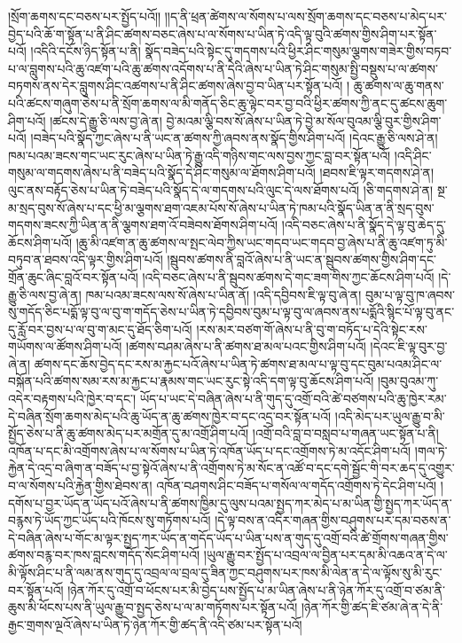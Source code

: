 །སྲོག་ཆགས་དང་བཅས་པར་སྤྱོད་པའོ།། །།ད་ནི་ཕྲན་ཚེགས་ལ་སོགས་པ་ལས་སྲོག་ཆགས་དང་བཅས་པ་མེད་པར་བྱེད་པའི་ཆོ་ག་སྟོན་པ་ནི་ཤིང་ཚགས་བཅང་ཞེས་པ་ལ་སོགས་པ་ཡིན་ཏེ་འདི་ལྟ་བུའི་ཚགས་གྱིས་ཤིག་པར་སྟོན་པའོ། །འདིའི་དངོས་ཉིད་སྟོན་པ་ནི། སྣོད་བཟེད་པའི་སྟེང་དུ་གདགས་པའི་ཕྱིར་ཤིང་གསུམ་ལྕགས་གཟེར་གྱིས་བཏབ་པ་ལ་བླུགས་པའི་ཆུ་འཛག་པའི་ཆུ་ཚགས་འདོགས་པ་ནི་དེའི་ཞེས་པ་ཡིན་ཏེ་ཤིང་གསུམ་སྤྱི་བསྡུས་པ་ལ་ཚགས་བཏགས་ནས་དེར་བླུགས་ཤིང་འཚགས་པ་ནི་ཤིང་ཚགས་ཞེས་བྱ་བ་ཡིན་པར་སྟོན་པའོ། །
ཆུ་ཚགས་ལ་ཆུ་གནས་པའི་ཚངས་གཞུག་ཅེས་པ་ནི་སྲོག་ཆགས་ལ་མི་གནོད་ཅིང་ཆུ་ལྟེང་བར་བྱ་བའི་ཕྱིར་ཚགས་ཀྱི་ནང་དུ་ཚངས་ཆུག་ཤིག་པའོ། །ཚངས་དེ་རྒྱུ་ཅི་ལས་བྱ་ཞེ་ན། བྱེ་མའམ་ལྕི་བས་སོ་ཞེས་པ་ཡིན་ཏེ་བྱེ་མ་སོལ་བུའམ་ལྕི་བུར་གྱིས་ཤིག་པའོ། །བཟེད་པའི་སྣོད་ཀྱང་ཞེས་པ་ནི་ཡང་ན་ཚགས་ཀྱི་ཞབས་ནས་སྣོད་གྱིས་ཤིག་པའོ། །དེའང་རྒྱུ་ཅི་ལས་ཤེ་ན། ཁམ་པའམ་ཟངས་གང་ཡང་རུང་ཞེས་པ་ཡིན་ཏེ་རྒྱུ་འདི་གཉིས་གང་ལས་བྱས་ཀྱང་བླ་བར་སྟོན་པའོ། །འདི་ཤིང་གསུམ་ལ་གདགས་ཞེས་པ་ནི་བཟེད་པའི་སྣོད་དེ་ཤིང་གསུམ་ལ་ཐོགས་ཤིག་པའོ། །ཐབས་ཇི་ལྟར་གདགས་ཤེ་ན། ལུང་ནས་བརྟོད་ཅེས་པ་ཡིན་ཏེ་བཟེད་པའི་སྣོད་དེ་ལ་གདགས་པའི་ལུང་དེ་ལས་ཐོགས་པའོ། །ཅི་གདགས་ཤེ་ན། སྔ་མ་སྲད་བུས་སོ་ཞེས་པ་དང་ཕྱི་མ་ལྕགས་ཐག་འཇམ་པོས་སོ་ཞེས་པ་ཡིན་ཏེ་ཁམ་པའི་སྣོད་ཡིན་ན་ནི་སྲད་བུས་གདགས་ཟངས་ཀྱི་ཡིན་ན་ནི་ལྕགས་ཐག་འོ་བཟེབས་ཐོགས་ཤིག་པའོ། །འདི་བཅང་ཞེས་པ་ནི་སྣོད་དེ་ལྟ་བུ་ཆེད་དུ་ཆོངས་ཤིག་པའོ། །ཆུ་མི་འཛག་ན་ཆུ་ཚགས་ལ་སྤང་ལེབ་ཀྱིས་ཡང་གདབ་ཡང་གདབ་བྱ་ཞེས་པ་ནི་ཆུ་འཛག་ཏུ་མི་བཏུབ་ན་ཐབས་འདི་ལྟར་གྱིས་ཤིག་པའོ། །སྦུབས་ཚགས་ནི་བླའོ་ཞེས་པ་ནི་ཡང་ན་སྦུབས་ཚགས་གྱིས་ཤིག་དང་གྲོན་ཆུང་ཞིང་བླའོ་བར་སྟོན་པའོ། །འདི་བཅང་ཞེས་པ་ནི་སྦུབས་ཚགས་དེ་གང་ཟག་གིས་ཀྱང་ཆོངས་ཤིག་པའོ། །དེ་རྒྱུ་ཅི་ལས་བྱ་ཞེ་ན། ཁམ་པའམ་ཟངས་ལས་སོ་ཞེས་པ་ཡིན་ནོ། །འདི་དབྱིབས་ཇི་ལྟ་བུ་ཞེ་ན། བུམ་པ་ལྟ་བུ་ཁ་ཞབས་སུ་གདོད་ཅིང་པདྨོ་ལྟ་བུ་ལ་བུ་ག་གདོད་ཅེས་པ་ཡིན་ཏེ་དབྱིབས་བུམ་པ་ལྟ་བུ་ལ་ཞབས་ནས་པདྨོའི་སྙིང་པོ་ལྟ་བུ་ནང་དུ་རློ་བར་བྱས་པ་ལ་བུ་ག་མང་དུ་ཐོད་ཅིག་པའོ། །རས་མར་བཙག་གོ་ཞེས་པ་ནི་བུ་ག་བཏོད་པ་དེའི་སྟེང་རས་གཡོགས་ལ་ཚོགས་ཤིག་པའོ། །ཚགས་བཤམ་ཞེས་པ་ནི་ཚགས་ཐ་མལ་པའང་གྱིས་ཤིག་པའོ། །དེའང་ཇི་ལྟ་བུར་བྱ་ཞེ་ན། ཚགས་དང་ཆོས་བྱེད་དང་རས་མ་རྐྱང་པའོ་ཞེས་པ་ཡིན་ཏེ་ཚགས་ཐ་མལ་པ་ལྟ་བུ་དང་བུམ་པའམ་ཤིང་ལ་བསྐོན་པའི་ཚགས་སམ་རས་མ་རྐྱང་པ་རྣམས་གང་ཡང་རུང་སྟེ་འདི་དག་ལྟ་བུ་ཆོངས་ཤིག་པའོ། །བུམ་བུའམ་ཀུ་འདེར་བརྟགས་པའི་ཁྱེར་བ་དང་། ཡོད་པ་ཡང་དེ་བཞིན་ཞེས་པ་ནི་གུད་དུ་འགྲོ་བའི་ཚེ་བཙགས་པའི་ཆུ་ཁྱེར་རམ་དེ་བཞིན་སྲོག་ཆགས་མེད་པའི་ཆུ་ཡོད་ན་ཆུ་ཚགས་ཁྱེར་བ་དང་འདྲ་བར་སྟོན་པའོ། །འདི་མེད་པར་ཡུལ་རྒྱུ་བ་མི་སྤྱོད་ཅེས་པ་ནི་ཆུ་ཚགས་མེད་པར་མགྲོན་དུ་མ་འགྲོ་ཤིག་པའོ། །འགྲོ་བའི་བླ་བ་བསླབ་པ་གཞན་ཡང་སྟོན་པ་ནི། འཁོན་པ་དང་མི་འགྲོགས་ཞེས་པ་ལ་སོགས་པ་ཡིན་ཏེ་འཁོན་ཡོད་པ་དང་འགྲོགས་ཏེ་མ་འདོང་ཤིག་པའོ། །གལ་ཏེ་རྐྱེན་དེ་འདྲ་བ་ཞིག་ན་བཟོད་པ་བྱ་སྟེའོ་ཞེས་པ་ནི་འགྲོགས་ཏེ་མ་སོང་ན་འཚོ་བ་དང་དགེ་སྦྱོང་གི་བར་ཆད་དུ་འགྱུར་བ་ལ་སོགས་པའི་རྐྱེན་གྱིས་ཐེབས་ན། འཁོན་བཤགས་ཤིང་བཟོད་པ་གསོལ་ལ་གདོད་འགྲོགས་ཏེ་དེང་ཤིག་པའོ། །དགོས་པ་བྱར་ཡོད་ན་ཡོད་པའོ་ཞེས་པ་ནི་ཚགས་ཁྱིམ་དུ་ལུས་པའམ་སྤྱད་ཀར་མེད་པ་མ་ཡིན་གྱི་སྤྱད་ཀར་ཡོད་ན་བརྙས་ཏེ་ཡོད་ཀྱང་ཡོད་པའི་ཁོངས་སུ་གཏོགས་པའོ། །དེ་ལྟ་བས་ན་འདིར་གཞན་གྱིས་བཤུགས་པར་དམ་བཅས་ན་དེ་བཞིན་ཞེས་པ་གོང་མ་ལྟར་སྤྱད་ཀར་ཡོད་ན་གདོད་ཡོད་པ་ཡིན་པས་ན་གུད་དུ་འགྲོ་བའི་ཚེ་གྲོགས་གཞན་གྱིས་ཚགས་བརྙ་བར་ཁས་བླངས་གདོད་སོང་ཤིག་པའོ། །ཡུལ་རྒྱུ་བར་སྤྱོད་པ་འབྲལ་ལ་བྱིན་པར་དམ་མི་འཆའ་ན་དེ་ལ་མི་ལྟོས་ཤིང་པ་ནི་ལམ་ནས་གུད་དུ་འབྲལ་ལ་བྲལ་དུ་ཟིན་ཀྱང་བཤུགས་པར་ཁས་མི་ལེན་ན་དེ་ལ་ལྟོས་སུ་མི་རུང་བར་སྟོན་པའོ། །ཉེན་ཀོར་དུ་འགྲོ་བ་ཕོངས་པར་མི་བྱེད་པས་སྤྱོད་པ་མ་ཡིན་ཞེས་པ་ནི་ཉེན་ཀོར་དུ་འགྲོ་བ་ཙམ་ནི་ཆུས་མི་ཕོངས་པས་ནི་ཡུལ་རྒྱུ་བ་སྤྱད་ཅེས་པ་ལ་མ་གཏོགས་པར་སྟོན་པའོ། །ཉེན་ཀོར་གྱི་ཚད་ཇི་ཙམ་ཞེ་ན་དེ་ནི་རྒྱང་གྲགས་ལྔའོ་ཞེས་པ་ཡིན་ཏེ་ཉེན་ཀོར་གྱི་ཚད་ནི་འདི་ཙམ་པར་སྟོན་པའོ། 